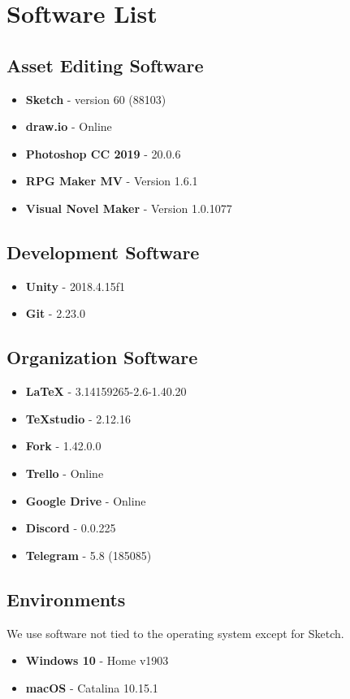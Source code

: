 \section{Software List}

\subsection{Asset Editing Software}

\begin{itemize}
	\item \textbf{Sketch} - version 60 (88103)
	\item \textbf{draw.io} - Online
	\item \textbf{Photoshop CC 2019} - 20.0.6
	\item \textbf{RPG Maker MV} - Version 1.6.1
	\item \textbf{Visual Novel Maker} - Version 1.0.1077
\end{itemize}


\subsection{Development Software}

\begin{itemize}
	\item \textbf{Unity} - 2018.4.15f1
	\item \textbf{Git} - 2.23.0
	
\end{itemize}

\subsection{Organization Software}

\begin{itemize}
	\item \textbf{LaTeX} - 3.14159265-2.6-1.40.20
	\item \textbf{TeXstudio} - 2.12.16
	\item \textbf{Fork} - 1.42.0.0
	\item \textbf{Trello} - Online
	\item \textbf{Google Drive} - Online
	\item \textbf{Discord} - 0.0.225
	\item \textbf{Telegram} - 5.8 (185085)
\end{itemize}

\subsection{Environments}
We use software not tied to the operating system except for Sketch.

\begin{itemize}
	\item \textbf{Windows 10} - Home v1903
	\item \textbf{macOS} - Catalina 10.15.1
\end{itemize}
